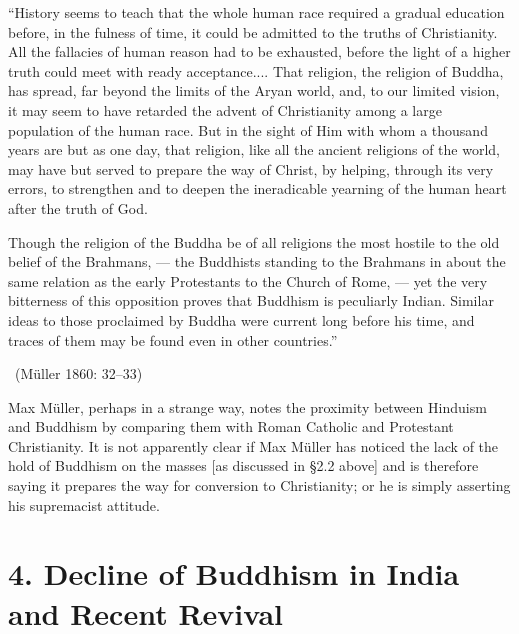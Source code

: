 \begin{myquote}
“History seems to teach that the whole human race required a gradual education before, in the fulness of time, it could be admitted to the truths of Christianity. All the fallacies of human reason had to be exhausted, before the light of a higher truth could meet with ready acceptance.... That religion, the religion of Buddha, has spread, far beyond the limits of the Aryan world, and, to our limited vision, it may seem to have retarded the advent of Christianity among a large population of the human race. But in the sight of Him with whom a thousand years are but as one day, that religion, like all the ancient religions of the world, may have but served to prepare the way of Christ, by helping, through its very errors, to strengthen and to deepen the ineradicable yearning of the human heart after the truth of God.
\end{myquote}

\begin{myquote}
Though the religion of the Buddha be of all religions the most hostile to the old belief of the Brahmans, — the Buddhists standing to the Brahmans in about the same relation as the early Protestants to the Church of Rome, — yet the very bitterness of this opposition proves that Buddhism is peculiarly Indian. Similar ideas to those proclaimed by Buddha were current long before his time, and traces of them may be found even in other countries.” 

~\hfill (Müller 1860: 32–33)
\end{myquote}

Max Müller, perhaps in a strange way, notes the proximity between Hinduism and Buddhism by comparing them with Roman Catholic and Protestant Christianity. It is not apparently clear if Max Müller has noticed the lack of the hold of Buddhism on the masses [as discussed in §2.2 above] and is therefore saying it prepares the way for conversion to Christianity; or he is simply asserting his supremacist attitude.


\section*{4. Decline of Buddhism in India and Recent Revival}

